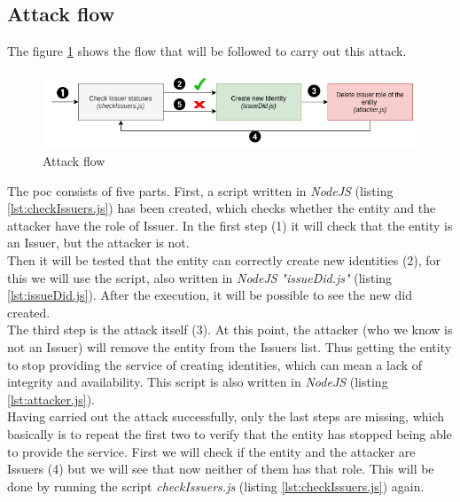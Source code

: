 \documentclass[a4paper, 12pt]{article} %
\begin{document}
    \subsection{Attack flow}
        The figure \ref{fig:poc-flow} shows the flow that will be followed to carry out this attack.
        \begin{figure}[h]
            \centering
            \includegraphics[width=1.1\textwidth]{poc-flow.png}
            \caption{Attack flow}
            \label{fig:poc-flow}
        \end{figure}
        
        The \acrshort{poc} consists of five parts. First, a script written in \textit{NodeJS} (listing \ref{lst:checkIssuers.js}) has been created, which checks whether the entity and the attacker have the role of Issuer. In the first step (1) it will check that the entity is an Issuer, but the attacker is not.\\
        
        
        Then it will be tested that the entity can correctly create new identities (2), for this we will use the script, also written in \textit{NodeJS} \textit{"issueDid.js"} (listing \ref{lst:issueDid.js}). After the execution, it will be possible to see the new \acrshort{did} created.\\
        
        
        The third step is the attack itself (3). At this point, the attacker (who we know is not an Issuer) will remove the entity from the Issuers list. Thus getting the entity to stop providing the service of creating identities, which can mean a lack of integrity and availability. This script is also written in \textit{NodeJS} (listing \ref{lst:attacker.js}).\\
        
        
        Having carried out the attack successfully, only the last steps are missing, which basically is to repeat the first two to verify that the entity has stopped being able to provide the service. First we will check if the entity and the attacker are Issuers (4) but we will see that now neither of them has that role. This will be done by running the script \textit{checkIssuers.js} (listing \ref{lst:checkIssuers.js}) again. \\
        
\end{document}
